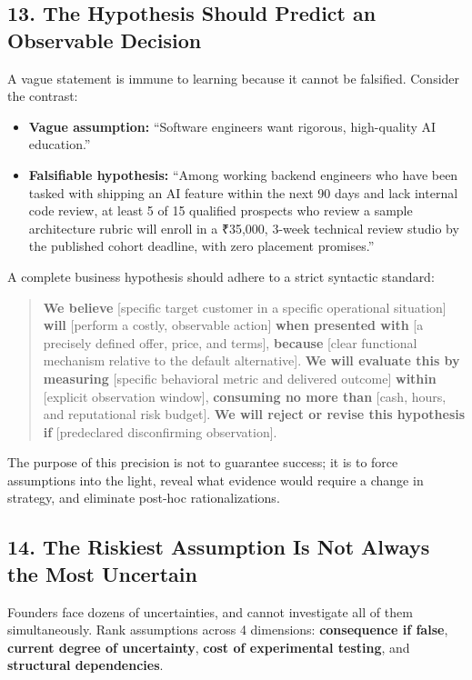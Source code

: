 \subsection*{13. The Hypothesis Should Predict an Observable Decision}

A vague statement is immune to learning because it cannot be falsified. Consider the contrast:
\begin{itemize}
    \item \textbf{Vague assumption:} ``Software engineers want rigorous, high-quality AI education.''
    \item \textbf{Falsifiable hypothesis:} ``Among working backend engineers who have been tasked with shipping an AI feature within the next 90 days and lack internal code review, at least 5 of 15 qualified prospects who review a sample architecture rubric will enroll in a ₹35,000, 3-week technical review studio by the published cohort deadline, with zero placement promises.''
\end{itemize}

A complete business hypothesis should adhere to a strict syntactic standard:

\begin{quote}
\textbf{We believe} [specific target customer in a specific operational situation] \textbf{will} [perform a costly, observable action] \textbf{when presented with} [a precisely defined offer, price, and terms], \textbf{because} [clear functional mechanism relative to the default alternative]. \textbf{We will evaluate this by measuring} [specific behavioral metric and delivered outcome] \textbf{within} [explicit observation window], \textbf{consuming no more than} [cash, hours, and reputational risk budget]. \textbf{We will reject or revise this hypothesis if} [predeclared disconfirming observation].
\end{quote}

The purpose of this precision is not to guarantee success; it is to force assumptions into the light, reveal what evidence would require a change in strategy, and eliminate post-hoc rationalizations.

\subsection*{14. The Riskiest Assumption Is Not Always the Most Uncertain}

Founders face dozens of uncertainties, and cannot investigate all of them simultaneously. Rank assumptions across 4 dimensions: \textbf{consequence if false}, \textbf{current degree of uncertainty}, \textbf{cost of experimental testing}, and \textbf{structural dependencies}.

